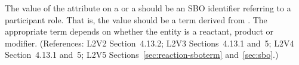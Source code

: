 The value of the  attribute on a \SpeciesReference or a
\ModifierSpeciesReference should be an SBO identifier referring to a
participant role.  That is, the value should be a term derived
from \sboparticipantrole.  The appropriate term depends on whether
the entity is a reactant, product or modifier.  (References: 
L2V2 Section~4.13.2; L2V3 Sections~4.13.1 and~5; L2V4 Section~4.13.1 and~5; L2V5 Sections~\ref{sec:reaction-sboterm} and~\ref{sec:sbo}.)
